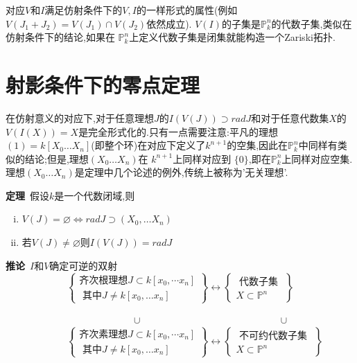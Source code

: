 \documentclass[UTF8]{book}
\begin{document}
		对应$ V $和$ I $满足仿射条件下的$ V,I $的一样形式的属性(例如$V \left( J _{1}+ J _{2}\right)=  V \left( J _{1}\right) \cap V \left( J _{2}\right) $依然成立). $V ( I )$的子集是$\mathbb{P}^{n} _{ k }$的代数子集,类似在仿射条件下的结论,如果在 $\mathbb{P} ^{n}_{k}$上定义代数子集是闭集就能构造一个Zariski拓扑.
		
		
	\section{射影条件下的零点定理}
		在仿射意义的对应下,对于任意理想$ J $的$I ( V ( J )) \supset rad J$和对于任意代数集$ X $的$ V(I(X))  = X$是完全形式化的.只有一点需要注意:平凡的理想$(1) = k \left[ X _{0} \ldots X _{ n }\right]$(即整个环)在对应下定义了$k ^{ n +1}$的空集,因此在$\mathbb{P} ^{n}_{ k }$中同样有类似的结论;但是,理想$\left(X_{0} \ldots X_{n}\right)$在 $k ^{n+1}$上同样对应到 $\{0\}$,即在$\mathbb{P} ^{n}_{ k }$上同样对应空集.理想$\left(X_{0} \ldots X_{n}\right)$是定理中几个论述的例外,传统上被称为'无关理想'.
		
		
		\textbf{定理}\ 假设$ k $是一个代数闭域,则
		\begin{enumerate}[(i)]
			\item $ V ( J )=\varnothing  \Longleftrightarrow rad J \supset\left( X _{0}, \ldots X _{ n }\right)$
			\item 若$V ( J ) \neq \varnothing$则$ I ( V ( J ))= rad J $
		\end{enumerate}
		
		
		\textbf{推论}\ $ I $和$ V $确定可逆的双射
		\begin{equation*}
		\left\{\begin{array}{l}
		{\text {齐次根理想} J \subset k [x_{0}, \cdots x_{n} ]} \\
		{\text { 其中} J \neq k [x_{0}, \ldots x_{n} ]} 
		\end{array}\right\}
		 \longleftrightarrow
		 \left\{\begin{array}{c}
		{\text { 代数子集 }} \\
		{X \subset \mathbb{P} ^{n}}
		\end{array}\right\}
		\end{equation*}
		
		$\qquad \quad \qquad\qquad \qquad \qquad \qquad \cup \qquad \qquad \qquad\qquad \qquad \qquad \qquad \cup $
		\begin{equation*}
		\qquad\quad
		\left\{\begin{array}{l}
		{\text {齐次素理想} J \subset k [x_{0}, \cdots x_{n} ]} \\
		{\text { 其中} J \neq k [x_{0}, \ldots x_{n} ]} 
		\end{array}\right\}
		\longleftrightarrow
		\left\{\begin{array}{c}
		{\text { 不可约代数子集 }} \\
		{X \subset \mathbb{P} ^{n}}
		\end{array}\right\}
		\end{equation*}
		
\end{document}
